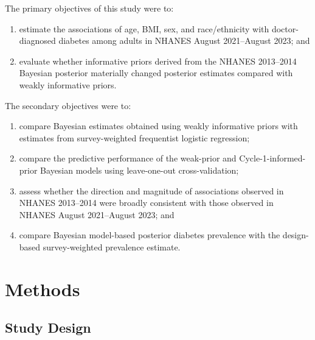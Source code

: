 \documentclass[11pt]{article}
\begin{document}
The primary objectives of this study were to:

\begin{enumerate}[label=(\roman*)]
    \item estimate the associations of age, BMI, sex, and race/ethnicity with
    doctor-diagnosed diabetes among adults in NHANES August 2021--August
    2023; and

    \item evaluate whether informative priors derived from the NHANES
    2013--2014 Bayesian posterior materially changed posterior estimates
    compared with weakly informative priors.
\end{enumerate}

The secondary objectives were to:

\begin{enumerate}[label=(\roman*)]
    \item compare Bayesian estimates obtained using weakly informative priors
    with estimates from survey-weighted frequentist logistic regression;

    \item compare the predictive performance of the weak-prior and
    Cycle-1-informed-prior Bayesian models using leave-one-out cross-validation;

    \item assess whether the direction and magnitude of associations observed
    in NHANES 2013--2014 were broadly consistent with those observed in
    NHANES August 2021--August 2023; and

    \item compare Bayesian model-based posterior diabetes prevalence with the
    design-based survey-weighted prevalence estimate.
\end{enumerate}
 





\section{Methods} 


\subsection{Study Design}
\end{document}
